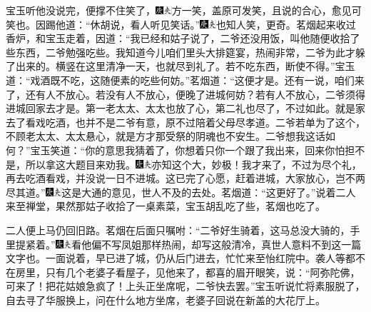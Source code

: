 宝玉听他没说完，便撑不住笑了，{\includegraphics[width=3mm]{../Images/00004}\includegraphics[width=3mm]{../Images/00012}\footnotesize \kaishu 方一笑，盖原可发笑，且说的合心，愈见可笑也。}因踢他道：``休胡说，看人听见笑话。''{\includegraphics[width=3mm]{../Images/00004}\includegraphics[width=3mm]{../Images/00012}\footnotesize \kaishu 也知人笑，更奇。}茗烟起来收过香炉，和宝玉走着，因道：``我已经和姑子说了，二爷还没用饭，叫他随便收拾了些东西，二爷勉强吃些。我知道今儿咱们里头大排筵宴，热闹非常，二爷为此才躲了出来的。横竖在这里清净一天，也就尽到礼了。若不吃东西，断使不得。''宝玉道：``戏酒既不吃，这随便素的吃些何妨。''茗烟道：``这便才是。还有一说，咱们来了，还有人不放心。若没有人不放心，便晚了进城何妨？若有人不放心，二爷须得进城回家去才是。第一老太太、太太也放了心，第二礼也尽了，不过如此。就是家去了看戏吃酒，也并不是二爷有意，原不过陪着父母尽孝道。二爷若单为了这个，不顾老太太、太太悬心，就是方才那受祭的阴魂也不安生。二爷想我这话如何？''宝玉笑道：``你的意思我猜着了，你想着只你一个跟了我出来，回来你怕担不是，所以拿这大题目来劝我。{\includegraphics[width=3mm]{../Images/00004}\includegraphics[width=3mm]{../Images/00012}\footnotesize \kaishu 亦知这个大，妙极！}我才来了，不过为尽个礼，再去吃酒看戏，并没说一日不进城。这已完了心愿，赶着进城，大家放心，岂不两尽其道。''{\includegraphics[width=3mm]{../Images/00004}\includegraphics[width=3mm]{../Images/00012}\footnotesize \kaishu 这是大通的意见，世人不及的去处。}茗烟道：``这更好了。''说着二人来至禅堂，果然那姑子收拾了一桌素菜，宝玉胡乱吃了些，茗烟也吃了。

二人便上马仍回旧路。茗烟在后面只嘱咐：``二爷好生骑着，这马总没大骑的，手里提紧着。''{\includegraphics[width=3mm]{../Images/00004}\includegraphics[width=3mm]{../Images/00012}\footnotesize \kaishu 看他偏不写凤姐那样热闹，却写这般清冷，真世人意料不到这一篇文字也。}一面说着，早已进了城，仍从后门进去，忙忙来至怡红院中。袭人等都不在房里，只有几个老婆子看屋子，见他来了，都喜的眉开眼笑，说：``阿弥陀佛，可来了！把花姑娘急疯了！上头正坐席呢，二爷快去罢。''宝玉听说忙将素服脱了，自去寻了华服换上，问在什么地方坐席，老婆子回说在新盖的大花厅上。

